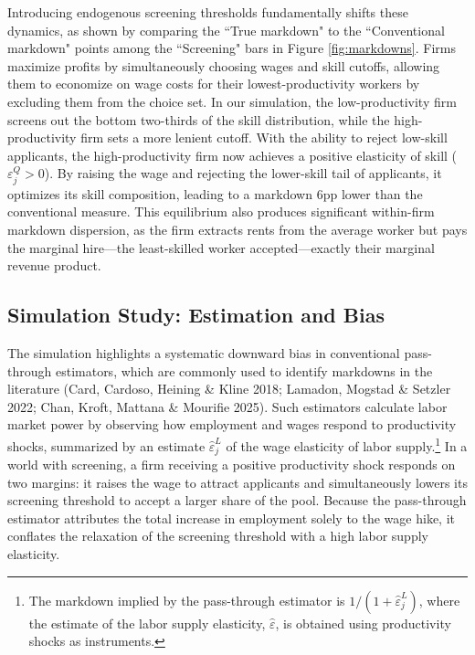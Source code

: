 \documentclass[11pt]{article}
\begin{document}
Introducing endogenous screening thresholds fundamentally shifts these dynamics, as shown by comparing the ``True markdown" to the ``Conventional markdown" points among the ``Screening" bars in Figure \ref{fig:markdowns}. Firms maximize profits by simultaneously choosing wages and skill cutoffs, allowing them to economize on wage costs for their lowest-productivity workers by excluding them from the choice set. In our simulation, the low-productivity firm screens out the bottom two-thirds of the skill distribution, while the high-productivity firm sets a more lenient cutoff. With the ability to reject low-skill applicants, the high-productivity firm now achieves a positive elasticity of skill ($\varepsilon_j^Q > 0$). By raising the wage and rejecting the lower-skill tail of applicants, it optimizes its skill composition, leading to a markdown 6pp lower than the conventional measure. This equilibrium also produces significant within-firm markdown dispersion, as the firm extracts rents from the average worker but pays the marginal hire---the least-skilled worker accepted---exactly their marginal revenue product. 


\subsection{Simulation Study: Estimation and Bias}

The simulation highlights a systematic downward bias in conventional pass-through estimators, which are commonly used to identify markdowns in the literature (Card, Cardoso, Heining \& Kline 2018; Lamadon, Mogstad \& Setzler 2022; Chan, Kroft, Mattana \& Mourifie 2025). Such estimators calculate labor market power by observing how employment and wages respond to productivity shocks, summarized by an estimate $\hat{\varepsilon}_j^L$ of the wage elasticity of labor supply.\footnote{The markdown implied by the pass-through estimator is $1/(1+\hat{\varepsilon}_j^L)$, where the estimate of the labor supply elasticity, $\hat\varepsilon$, is obtained using productivity shocks as instruments.} In a world with screening, a firm receiving a positive productivity shock responds on two margins: it raises the wage to attract applicants and simultaneously lowers its screening threshold to accept a larger share of the pool. Because the pass-through estimator attributes the total increase in employment solely to the wage hike, it conflates the relaxation of the screening threshold with a high labor supply elasticity. 
\end{document}
